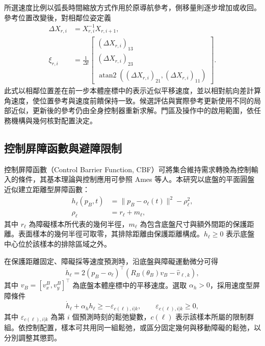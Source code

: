 所選速度比例以弧長時間縮放方式作用於原導航參考，側移量則逐步增加或收回。參考位置改變後，對相鄰位姿定義
\begin{equation}
    \begin{aligned}
        \Delta X_{r,i}
        &=X_{r,i}^{-1}X_{r,i+1},\\
        \xi_{r,i}
        &=\frac{1}{\Delta t}
          \begin{bmatrix}
            (\Delta X_{r,i})_{13}\\
            (\Delta X_{r,i})_{23}\\
            \operatorname{atan2}
              ((\Delta X_{r,i})_{21},(\Delta X_{r,i})_{11})
          \end{bmatrix}.
    \end{aligned}
    \label{eq:ch3_reference_velocity_reconstruction}
\end{equation}
此式以相鄰位置差在前一步本體座標中的表示近似平移速度，並以相對航向差計算角速度，使位置參考與速度前饋保持一致。候選評估與實際參考更新使用不同的局部近似，更新後的參考仍由全身控制器重新求解。門區及操作中的啟用範圍，依任務機構與幾何核對配置決定。

\subsection{控制屏障函數與避障限制}
\label{subsec:cbf_obstacle_constraints}

控制屏障函數（Control Barrier Function, CBF）可將集合維持需求轉換為控制輸入的條件，其基本理論與控制應用可參照 Ames 等人\cite{ames2019cbf}。本研究以底盤的平面圓盤近似建立距離型屏障函數：
\begin{equation}
    \begin{aligned}
        h_{\ell}(p_B,t)
        &=\|p_B-o_{\ell}(t)\|^2-\rho_{\ell}^{2}, \\
        \rho_{\ell}
        &=r_{\ell}+m_{\ell},
    \end{aligned}
    \label{eq:ch3_obstacle_barrier_function}
\end{equation}
其中 $r_{\ell}$ 為障礙樣本所代表的幾何半徑，$m_{\ell}$ 為包含底盤尺寸與額外間距的保護距離。表面樣本的幾何半徑可取零，其排除距離由保護距離構成。$h_{\ell}\geq0$ 表示底盤中心位於該樣本的排除區域之外。

在保護距離固定、障礙採等速度預測時，沿底盤與障礙運動微分可得
\begin{equation}
    \dot{h}_{\ell}
    =2(p_B-o_{\ell})^{\top}
      \left(R_B(\theta_B)v_B-\hat{v}_{\ell,k}\right),
    \label{eq:ch3_obstacle_barrier_derivative}
\end{equation}
其中 $v_B=[v_x^B,v_y^B]^{\top}$ 為底盤本體座標中的平移速度。選取 $\alpha_h>0$，採用速度型屏障條件
\begin{equation}
    \dot{h}_{\ell}+\alpha_h h_{\ell}
    \geq-\varepsilon_{c(\ell),i|k},
    \qquad \varepsilon_{c(\ell),i|k}\geq0,
    \label{eq:ch3_velocity_cbf_condition}
\end{equation}
其中 $\varepsilon_{c(\ell),i|k}$ 為第 $i$ 個預測時刻的鬆弛變數，$c(\ell)$ 表示該樣本所屬的限制群組。依控制配置，樣本可共用同一組鬆弛，或區分固定幾何與移動障礙的鬆弛，以分別調整其懲罰。

